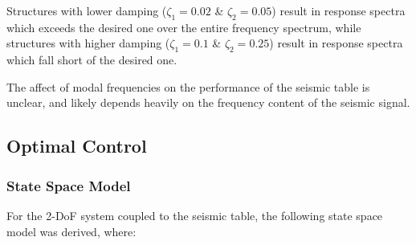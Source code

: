 \documentclass[9pt]{extarticle}
\begin{document}
Structures with %
lower damping ($\zeta_1=0.02$ \& $\zeta_2=0.05$) result in response spectra which exceeds the desired one over the entire frequency spectrum, while structures with higher damping ($\zeta_1=0.1$ \& $\zeta_2=0.25$) result in response spectra which fall short of the desired one.

The affect of modal frequencies on the performance of the seismic table is unclear, and likely depends heavily on the frequency content of the seismic signal.


\clearpage
\subsection{Optimal Control}  

\subsubsection{ State Space Model } \label{section_ss_model}
For the 2-DoF system coupled to the seismic table, the following state space model was derived, where:
\end{document}
